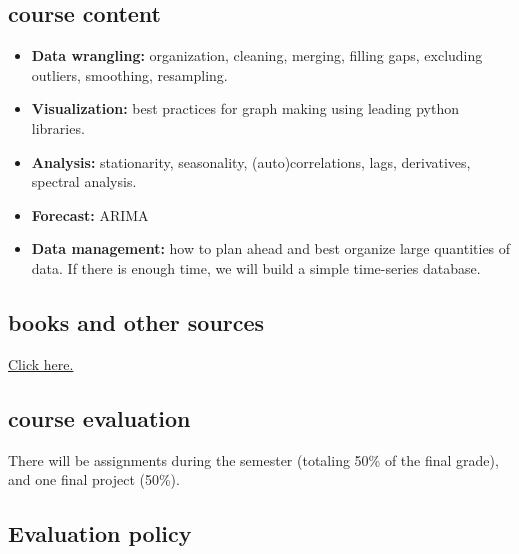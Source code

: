 \documentclass[
  letterpaper,
  DIV=11,
  numbers=noendperiod,
  oneside]{scrreprt}
\providecommand{\tightlist}{%
  \setlength{\itemsep}{0pt}\setlength{\parskip}{0pt}}\usepackage{longtable,booktabs,array}
\begin{document}
\hypertarget{course-content}{%
\subsection*{course content}\label{course-content}}

\begin{itemize}
\tightlist
\item
  \textbf{Data wrangling:} organization, cleaning, merging, filling
  gaps, excluding outliers, smoothing, resampling.
\item
  \textbf{Visualization:} best practices for graph making using leading
  python libraries.
\item
  \textbf{Analysis:} stationarity, seasonality, (auto)correlations,
  lags, derivatives, spectral analysis.
\item
  \textbf{Forecast:} ARIMA
\item
  \textbf{Data management:} how to plan ahead and best organize large
  quantities of data. If there is enough time, we will build a simple
  time-series database.
\end{itemize}

\hypertarget{books-and-other-sources}{%
\subsection*{books and other sources}\label{books-and-other-sources}}

\href{references.html}{Click here.}

\hypertarget{course-evaluation}{%
\subsection*{course evaluation}\label{course-evaluation}}

There will be assignments during the semester (totaling 50\% of the
final grade), and one final project (50\%).

\hypertarget{evaluation-policy}{%
\subsection*{Evaluation policy}\label{evaluation-policy}}
\end{document}
